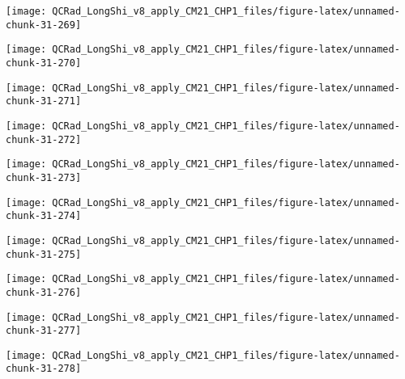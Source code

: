 \documentclass[
  10pt,
  a4paper,oneside]{article}
\begin{document}
\begin{center}\texttt{[image: QCRad\_LongShi\_v8\_apply\_CM21\_CHP1\_files/figure-latex/unnamed-chunk-31-269]} \end{center}

\begin{center}\texttt{[image: QCRad\_LongShi\_v8\_apply\_CM21\_CHP1\_files/figure-latex/unnamed-chunk-31-270]} \end{center}

\begin{center}\texttt{[image: QCRad\_LongShi\_v8\_apply\_CM21\_CHP1\_files/figure-latex/unnamed-chunk-31-271]} \end{center}

\begin{center}\texttt{[image: QCRad\_LongShi\_v8\_apply\_CM21\_CHP1\_files/figure-latex/unnamed-chunk-31-272]} \end{center}

\begin{center}\texttt{[image: QCRad\_LongShi\_v8\_apply\_CM21\_CHP1\_files/figure-latex/unnamed-chunk-31-273]} \end{center}

\begin{center}\texttt{[image: QCRad\_LongShi\_v8\_apply\_CM21\_CHP1\_files/figure-latex/unnamed-chunk-31-274]} \end{center}

\begin{center}\texttt{[image: QCRad\_LongShi\_v8\_apply\_CM21\_CHP1\_files/figure-latex/unnamed-chunk-31-275]} \end{center}

\begin{center}\texttt{[image: QCRad\_LongShi\_v8\_apply\_CM21\_CHP1\_files/figure-latex/unnamed-chunk-31-276]} \end{center}

\begin{center}\texttt{[image: QCRad\_LongShi\_v8\_apply\_CM21\_CHP1\_files/figure-latex/unnamed-chunk-31-277]} \end{center}

\begin{center}\texttt{[image: QCRad\_LongShi\_v8\_apply\_CM21\_CHP1\_files/figure-latex/unnamed-chunk-31-278]} \end{center}
\end{document}
